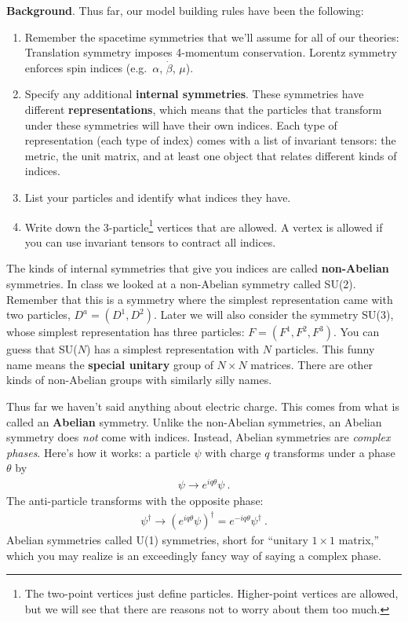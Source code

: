 \documentclass[12pt]{article}
\begin{document}
\begin{framed}
\textbf{Background}.	
Thus far, our model building rules have been the following:
\begin{enumerate}
	\item Remember the spacetime symmetries that we'll assume for all of our theories: Translation symmetry imposes 4-momentum conservation. Lorentz symmetry enforces spin indices (e.g.\ $\alpha$, $\dot\beta$, $\mu$).
	\item Specify any additional \textbf{internal symmetries}. These symmetries have different \textbf{representations}, which means that the particles that transform under these symmetries will have their own indices. Each type of representation (each type of index) comes with a list of invariant tensors: the metric, the unit matrix, and at least one object that relates different kinds of indices.
	\item List your particles and identify what indices they have. 
	\item Write down the 3-particle\footnote{The two-point vertices just define particles. Higher-point vertices are allowed, but we will see that there are reasons not to worry about them too much.} vertices that are allowed. A vertex is allowed if you can use invariant tensors to contract all indices.
\end{enumerate}
The kinds of internal symmetries that give you indices are called \textbf{non-Abelian} symmetries. In class we looked at a non-Abelian symmetry called SU(2). Remember that this is a symmetry where the simplest representation came with two particles, $D^a = (D^1, D^2)$.  Later we will also consider the symmetry SU(3), whose simplest representation has three particles: $F = (F^1, F^2, F^3)$. You can guess that SU($N$) has a simplest representation with $N$ particles. This funny name means the \textbf{special unitary} group of $N\times N$ matrices. There are other kinds of non-Abelian groups with similarly silly names.

Thus far we haven't said anything about electric charge. This comes from what is called an \textbf{Abelian} symmetry. Unlike the non-Abelian symmetries, an Abelian symmetry does \emph{not} come with indices. Instead, Abelian symmetries are \emph{complex phases}. Here's how it works: a particle $\psi$ with charge $q$ transforms under a phase $\theta$ by
\begin{align}
	\psi \to e^{iq\theta} \psi \ .
	\label{eq:phase}
\end{align}
The anti-particle transforms with the opposite phase:
\begin{align}
	\psi^\dag \to \left(e^{iq\theta}\psi\right)^\dag = e^{-iq\theta}\psi^\dag \ .
\end{align}
Abelian symmetries called U(1) symmetries, short for ``unitary $1\times 1$ matrix,'' which you may realize is an exceedingly fancy way of saying a complex phase.
\end{framed}
\end{document}

